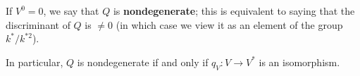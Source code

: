 If $V^0 = 0$, we say that $Q$ is \textbf{nondegenerate}; this is equivalent to saying that the discriminant of $Q$ is $\neq 0$ (in which case we view it as an element of the group $k^*/k^{*2}$).

In particular, $Q$ is nondegenerate if and only if $q_V: V \to V^*$ is an isomorphism.
